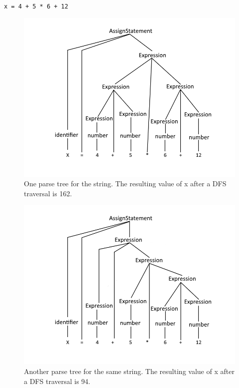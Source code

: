 \texttt{x = 4 + 5 * 6 + 12}

\begin{figure}[H]
	\centering
	\includegraphics[width=\textwidth/2+\textwidth/4]{3.Theory/images/AmbiguousGrammar1.png}
	\caption{One parse tree for the string. The resulting value of x after a DFS traversal is 162.}
	\label{fig:AmbiguousGrammarEx1}
\end{figure}

\begin{figure}[H]
	\centering
	\includegraphics[width=\textwidth/2+\textwidth/4]{3.Theory/images/AmbiguousGrammar2.png}
	\caption{Another parse tree for the same string. The resulting value of x after a DFS traversal is 94.}
	\label{fig:AmbiguousGrammarEx2}
\end{figure}

